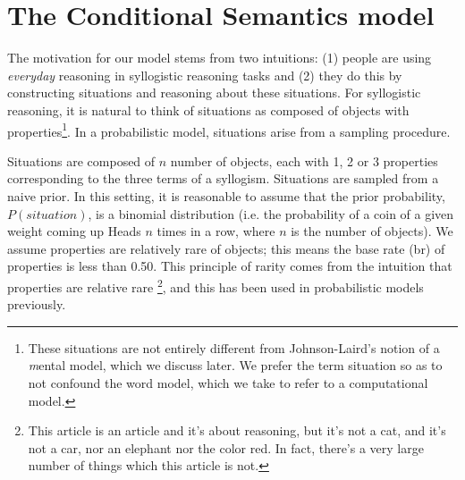 \documentclass[10pt,letterpaper]{article}
\begin{document}
%
%

\section{The Conditional Semantics model}

The motivation for our model stems from two intuitions: (1) people are using \emph{everyday} reasoning in syllogistic reasoning tasks and (2) they do this by constructing situations and reasoning about these situations. For syllogistic reasoning, it is natural to think of situations as composed of objects with properties\footnote{These situations are not entirely different from Johnson-Laird's notion of a {\emph mental model}, which we discuss later. We prefer the term situation so as to not confound the word model, which we take to refer to a computational model.}. In a probabilistic model, situations arise from a sampling procedure.

Situations are composed of $n$ number of objects, each with 1, 2 or 3 properties corresponding to the three terms of a syllogism. Situations are sampled from a naive prior. In this setting, it is reasonable to assume that the prior probability, $P(situation)$, is a binomial distribution (i.e. the probability of a coin of a given weight coming up Heads $n$ times in a row, where $n$ is the number of objects). We assume properties are relatively rare of objects; this means the base rate (br) of properties is less than 0.50.  This principle of rarity comes from the intuition that properties are relative rare \footnote{This article is an article and it's about reasoning, but it's not a cat, and it's not a car, nor an elephant nor the color red. In fact, there's a very large number of things which this article is not.}, and this has been used in probabilistic models previously. 
\end{document}
